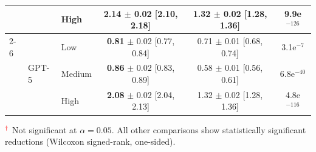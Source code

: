 \begin{table}[htb!]
\begin{tabular}{l l l c c c}
  &  & High   & \textbf{2.14} $\pm$ 0.02 [2.10, 2.18] & 1.32 $\pm$ 0.02 [1.28, 1.36] & 9.9e$^{-126}$ \\
  \cmidrule(lr){2-6}
  & \multirow{3}{*}{GPT-5}
    & Low    & \textbf{0.81} $\pm$ 0.02 [0.77, 0.84] & 0.71 $\pm$ 0.01 [0.68, 0.74] & 3.1e$^{-7}$ \\
  &  & Medium & \textbf{0.86} $\pm$ 0.02 [0.83, 0.89] & 0.58 $\pm$ 0.01 [0.56, 0.61] & 6.8e$^{-40}$ \\
  &  & High   & \textbf{2.08} $\pm$ 0.02 [2.04, 2.13] & 1.32 $\pm$ 0.02 [1.28, 1.36] & 4.8e$^{-116}$ \\
\bottomrule
\end{tabular}
\label{tab:safety_gap_by_domain_model_vpl}
\vspace{2pt}
\raggedright \footnotesize
$^{\textcolor{red}{\dagger}}$ Not significant at $\alpha=0.05$. All other comparisons show statistically significant reductions (Wilcoxon signed-rank, one-sided). 
\end{table}